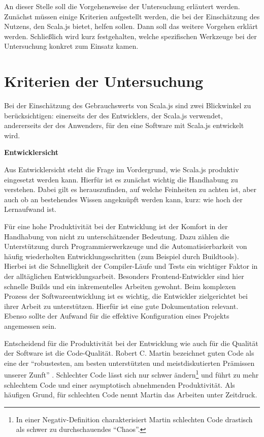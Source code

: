 \documentclass[a4paper, 12pt, hidelinks, listof=totoc, listoftables=totoc, bibliography=totoc]{scrreprt}
\newcommand{\MyMiniSec}[1]{\rmfamily\fontsize{12}{15}\selectfont
	\vspace{7pt}\textbf{#1} %
}
\begin{document}
An dieser Stelle soll die Vorgehensweise der Untersuchung erläutert werden. Zunächst müssen einige Kriterien aufgestellt werden, die bei der Einschätzung des Nutzens, den Scala.js bietet, helfen sollen. Dann soll das weitere Vorgehen erklärt werden. Schließlich wird kurz festgehalten, welche spezifischen Werkzeuge bei der Untersuchung konkret zum Einsatz kamen.

\section{Kriterien der Untersuchung}

Bei der Einschätzung des Gebrauchswerts von Scala.js sind zwei Blickwinkel zu berücksichtigen: einerseits der des Entwicklers, der Scala.js verwendet, andererseits der des Anwenders, für den eine Software mit Scala.js entwickelt wird.

\MyMiniSec{Entwicklersicht}

Aus Entwicklersicht steht die Frage im Vordergrund, wie Scala.js produktiv eingesetzt werden kann. Hierfür ist es zunächst wichtig die Handhabung zu verstehen. Dabei gilt es herauszufinden, auf welche Feinheiten zu achten ist, aber auch ob an bestehendes Wissen angeknüpft werden kann, kurz: wie hoch der Lernaufwand ist.

Für eine hohe Produktivität bei der Entwicklung ist der Komfort in der Handhabung von nicht zu unterschätzender Bedeutung. Dazu zählen die Unterstützung durch Programmierwerkzeuge und die Automatisierbarkeit von häufig wiederholten Entwicklungsschritten (zum Beispiel durch Buildtools). Hierbei ist die Schnelligkeit der Compiler-Läufe und Tests ein wichtiger Faktor in der alltäglichen Entwicklungsarbeit. Besonders Frontend-Entwickler sind hier schnelle Builds und ein inkrementelles Arbeiten gewohnt. Beim komplexen Prozess der Softwareentwicklung ist es wichtig, die Entwickler zielgerichtet bei ihrer Arbeit zu unterstützen. Hierfür ist eine gute Dokumentation relevant. Ebenso sollte der Aufwand für die effektive Konfiguration eines Projekts angemessen sein.

Entscheidend für die Produktivität bei der Entwicklung wie auch für die Qualität der Software ist die Code-Qualität. Robert C. Martin bezeichnet guten Code als eine der "`robustesten, am besten unterstützten und meistdiskutierten Prämissen unserer Zunft"' \cite[S. 27]{martin2009.CCH}. Schlechter Code lässt sich nur schwer ändern\footnote{In einer Negativ-Definition charakterisiert Martin schlechten Code drastisch als schwer zu durchschauendes "`Chaos"'.} und führt zu mehr schlechtem Code und einer asymptotisch abnehmenden Produktivität. Als häufigen Grund, für schlechten Code nennt Martin das Arbeiten unter Zeitdruck. \cite[S. 27 f.]{martin2009.CCH}
\end{document}
